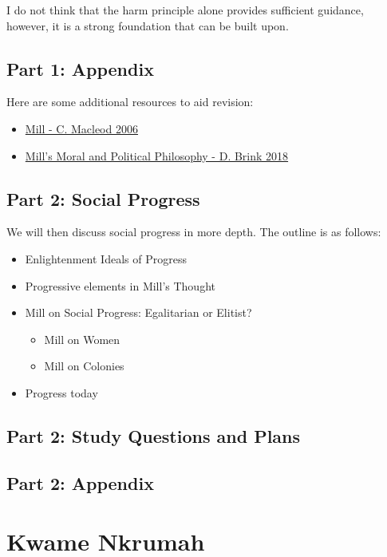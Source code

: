 \documentclass[12pt, letterpaper]{article}
\begin{document}
I do not think that the harm principle alone provides sufficient guidance, however, it is a strong foundation that can be built upon.





\subsection{Part 1: Appendix}
Here are some additional resources to aid revision:
\begin{itemize}
	\item \href{https://plato.stanford.edu/entries/mill/}{Mill - C. Macleod 2006}
	\item \href{https://plato.stanford.edu/entries/mill-moral-political/#LibPriCatApp}{Mill's Moral and Political Philosophy - D. Brink 2018}
\end{itemize}


\subsection{Part 2: Social Progress}
We will then discuss social progress in more depth. The outline is as follows:
\begin{itemize}
	\item Enlightenment Ideals of Progress
	\item Progressive elements in Mill's Thought
	\item Mill on Social Progress: Egalitarian or Elitist?
		\begin{itemize}
			\item Mill on Women
			\item Mill on Colonies
		\end{itemize}
	\item Progress today
\end{itemize}





\subsection{Part 2: Study Questions and Plans}




\subsection{Part 2: Appendix}



\newpage
\section{Kwame Nkrumah}
\end{document}
